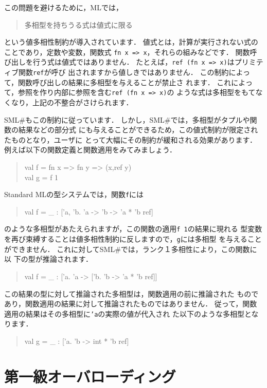 \documentclass{jbook}
\newcommand{\smlsharp}{SML\#}
\newenvironment{program}{\begin{tt}\begin{quote}}{\end{quote}\end{tt}}
\begin{document}
	この問題を避けるために，MLでは，
\begin{quote}
多相型を持ちうる式は値式に限る
\end{quote}
という値多相性制約が導入されています．
	値式とは，計算が実行されない式のことであり，定数や変数，関数式
{\tt fn x => x}，それらの組みなどです．
	関数呼び出しを行う式は値式ではありません．
	たとえば，{\tt ref (fn x => x)}はプリミティブ関数{\tt ref}が呼び
出されますから値しきではありません．
	この制約によって，関数呼び出しの結果に多相型を与えることが禁止さ
れます．
	これによって，参照を作り内部に参照を含む{\tt ref (fn x => x)}の
ような式は多相型をもてなくなり，上記の不整合がさけられます．

	\smlsharp{}もこの制約に従っています．
	しかし，\smlsharp{}では，多相型がタプルや関数の結果などの部分式
にも与えることができるため，この値式制約が限定されたものとなり，ユーザに
とって大幅にその制約が緩和される効果があります．
	例えば以下の関数定義と関数適用をみてみましょう．
\begin{program}
val f = fn x => fn y => (x,ref y)\\
val g = f 1\\
\end{program}
	Standard MLの型システムでは，関数{\tt f}には
\begin{program}
val f = \_ : ['a, 'b. 'a -> 'b -> 'a * 'b ref]
\end{program}
のような多相型があたえられますが，この関数の適用{\tt f 1}の結果に現れる
型変数を再び束縛することは値多相性制約に反しますので，{\tt g}には多相型
を与えることができません．
	これに対して\smlsharp{}では，ランク１多相性により，この関数に以
下の型が推論されます．
\begin{program}
val f = \_ : ['a. 'a -> ['b. 'b -> 'a * 'b ref]]
\end{program}
	この結果の型に対して推論された多相型は，関数適用の前に推論された
ものであり，関数適用の結果に対して推論されたものではありません．
	従って，関数適用の結果はその多相型に{\tt 'a}の実際の値が代入され
た以下のような多相型となります．
\begin{program}
val g = \_ :  ['a. 'b -> int * 'b ref]
\end{program}

\section{第一級オーバローディング}
\label{sec:extensionOverloading}
\end{document}
